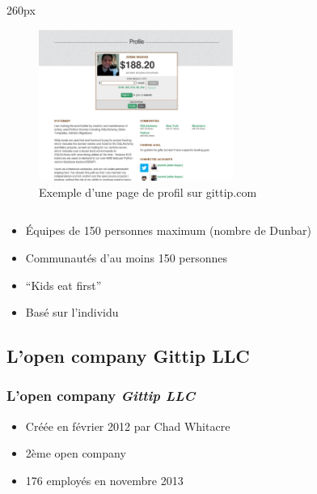 {
\logo{}
\begin{frame}
\begin{center}
\begin{columns}
\begin{column}{260px}
{
    \begin{figure}[h!]
        \centering
        \includegraphics[width=240px]{images/section1/profilepage-gittip.eps}
        \caption{Exemple d'une page de profil sur gittip.com}
    \end{figure}
}
\end{column}
\end{columns}
\end{center}
\end{frame}
}


\begin{frame}

\begin{itemize}
    \itemsep1.5em
    \item Équipes de 150 personnes maximum (nombre de Dunbar)
    \item Communautés d'au moins 150 personnes
    \item ``Kids eat first''
    \item Basé sur l'individu
\end{itemize}
\end{frame}

    \subsection{L'open company Gittip LLC}


\begin{frame}
\frametitle{L'open company \emph{Gittip LLC}}

\begin{itemize}
    \itemsep1.5em
    \item Créée en février 2012 par Chad Whitacre
    \item 2ème open company
    \item 176 employés en novembre 2013
\end{itemize}
\end{frame}


